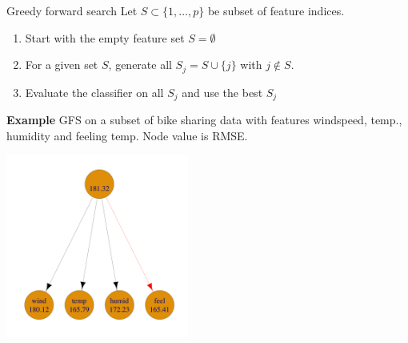 \documentclass[11pt,compress,t,notes=noshow, xcolor=table]{beamer}
\begin{document}



\begin{frame}{Greedy forward search}
Let $S \subset \{1, \dots, p \}$ be subset of feature indices.
\vspace{-0.01cm}
    \begin{enumerate}
      \item Start with the empty feature set $S = \emptyset$
      \item For a given set $S$, generate all $S_j = S \cup \{j\}$ with $j \notin S$.
      \item Evaluate the classifier on all $S_j$ and use the best $S_j$
      \end{enumerate}
    \textbf{Example} GFS on a subset of bike sharing data with features windspeed, temp., humidity and feeling temp. Node value is RMSE.
    \begin{center}
    \includegraphics[width = 0.45\textwidth]{sl/feature-selection/figure/fs-wrappers-powerset-tree-1.png}
    \end{center}

\end{frame}
\end{document}
